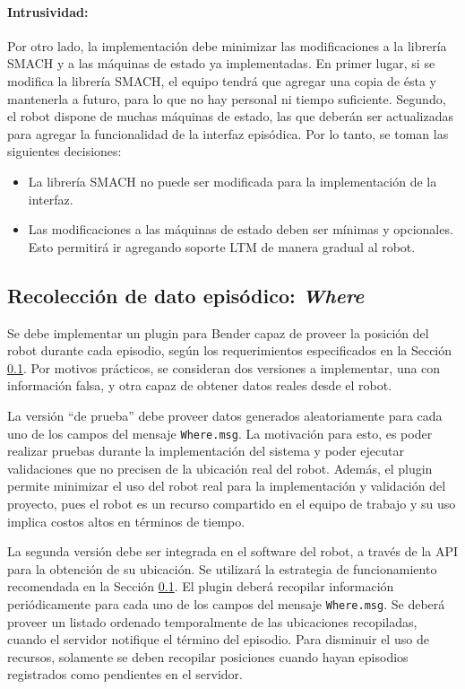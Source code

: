 \paragraph{Intrusividad:}
Por otro lado, la implementación debe minimizar las modificaciones a la librería SMACH y a las máquinas de estado ya implementadas. En primer lugar, si se modifica la librería SMACH, el equipo tendrá que agregar una copia de ésta y mantenerla a futuro, para lo que no hay personal ni tiempo suficiente. Segundo, el robot dispone de muchas máquinas de estado, las que deberán ser actualizadas para agregar la funcionalidad de la interfaz episódica. Por lo tanto, se toman las siguientes decisiones:
\begin{itemize}
\item La librería SMACH no puede ser modificada para la implementación de la interfaz.
\item Las modificaciones a las máquinas de estado deben ser mínimas y opcionales. Esto permitirá ir agregando soporte LTM de manera gradual al robot.
\end{itemize}



\subsection{Recolección de dato episódico: \textit{Where}}

Se debe implementar un plugin para Bender capaz de proveer la posición del robot durante cada episodio, según los requerimientos especificados en la Sección \ref{}. Por motivos prácticos, se consideran dos versiones a implementar, una con información falsa, y otra capaz de obtener datos reales desde el robot.

La versión ``de prueba'' debe proveer datos generados aleatoriamente para cada uno de los campos del mensaje \texttt{Where.msg}. La motivación para esto, es poder realizar pruebas durante la implementación del sistema y poder ejecutar validaciones que no precisen de la ubicación real del robot. Además, el plugin permite minimizar el uso del robot real para la implementación y validación del proyecto, pues el robot es un recurso compartido en el equipo de trabajo y su uso implica costos altos en términos de tiempo.

La segunda versión debe ser integrada en el software del robot, a través de la API para la obtención de su ubicación. Se utilizará la estrategia de funcionamiento recomendada en la Sección \ref{}. El plugin deberá recopilar información periódicamente para cada uno de los campos del mensaje \texttt{Where.msg}. Se deberá proveer un listado ordenado temporalmente de las ubicaciones recopiladas, cuando el servidor notifique el término del episodio. Para disminuir el uso de recursos, solamente se deben recopilar posiciones cuando hayan episodios registrados como pendientes en el servidor.



